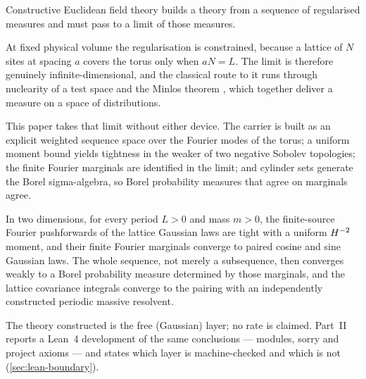Constructive Euclidean field theory builds a theory from a sequence of
regularised measures and must pass to a limit of those measures.

At fixed physical volume the regularisation is constrained, because a lattice of
$N$ sites at spacing $a$ covers the torus only when $aN = L$.  The limit is
therefore genuinely infinite-dimensional, and the classical route to it runs
through nuclearity of a test space and the Minlos theorem \cite{minlos1959},
which together deliver a measure on a space of distributions.

This paper takes that limit without either device.  The carrier is built as an
explicit weighted sequence space over the Fourier modes of the torus; a uniform
moment bound yields tightness in the weaker of two negative Sobolev topologies;
the finite Fourier marginals are identified in the limit; and cylinder sets
generate the Borel sigma-algebra, so Borel probability measures that agree on
marginals agree.

In two dimensions, for every period $L > 0$ and mass $m > 0$, the finite-source
Fourier pushforwards of the lattice Gaussian laws are tight with a uniform
$H^{-2}$ moment, and their finite Fourier marginals converge to paired cosine and
sine Gaussian laws.  The whole sequence, not merely a subsequence, then converges
weakly to a Borel probability measure determined by those marginals, and the
lattice covariance integrals converge to the pairing with an independently
constructed periodic massive resolvent.

The theory constructed is the free (Gaussian) layer; no rate is claimed.
Part~II reports a Lean~4 development of the same conclusions ---
\NumCleanModules{} modules, \NumCleanSorry{} sorry and \NumCleanProjectAxioms{}
project axioms --- and states which layer is machine-checked and which is not
(\cref{sec:lean-boundary}).
